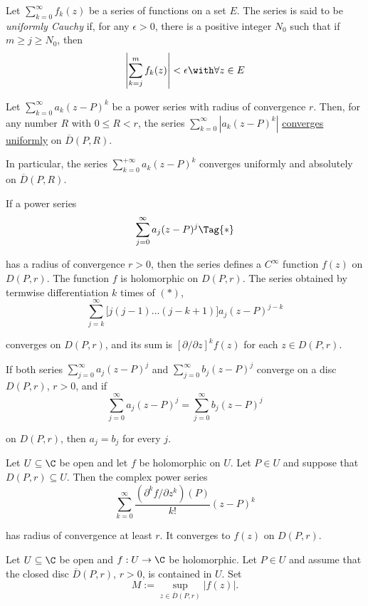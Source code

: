 Let $\sum_{k=0}^\infty f_k(z)$ be a series of functions on a set $E$. The
series is said to be \textit{uniformly Cauchy} if, for any $\epsilon>0$, there
is a positive integer $N_0$ such that if $m\geq j\geq N_0$, then
$$
  \left|\sum_{k=j}^mf_k(z)\right|<\epsilon\with\forall z\in E
$$

\label{ec076c1}

Let $\sum_{k=0}^\infty a_k(z-P)^k$ be a power series with radius of convergence
$r$. Then, for any number $R$ with $0\leq R<r$, the series
$\sum_{k=0}^\infty|a_k(z-P)^k|$ \href{bba67e4}{converges uniformly} on
$\overline D(P,R)$.

In particular, the series $\sum_{k=0}^{+\infty}a_k(z-P)^k$ converges uniformly
and absolutely on $\overline D(P,R)$.

\label{ccf2595}

If a power series
\begin{equation*}
  \sum_{j=0}^\infty a_j(z-P)^j\Tag{*}
\end{equation*}

has a radius of convergence $r>0$, then the series defines a $C^\infty$
function $f(z)$ on $D(P,r)$. The function $f$ is holomorphic on $D(P,r)$. The
series obtained by termwise differentiation $k$ times of $(*)$,
$$
  \sum_{j=k}^\infty\Big[j(j-1)\ldots(j-k+1)\Big]a_j(z-P)^{j-k}
$$

converges on $D(P,r)$, and its sum is $[\partial/\partial z]^kf(z)$ for each
$z\in D(P,r)$.

\label{ea8c930}

If both series $\sum_{j=0}^\infty a_j(z-P)^j$ and $\sum_{j=0}^\infty
b_j(z-P)^j$ converge on a disc $D(P,r)$, $r>0$, and if
$$
  \sum_{j=0}^\infty a_j(z-P)^j=\sum_{j=0}^\infty b_j(z-P)^j
$$

on $D(P,r)$, then $a_j=b_j$ for every $j$.

\label{b43209d}

Let $U\subseteq\C$ be open and let $f$ be holomorphic on $U$. Let $P\in U$ and
suppose that $D(P,r)\subseteq U$. Then the complex power series
$$
  \sum_{k=0}^\infty\frac{(\partial^kf/\partial z^k)(P)}{k!}(z-P)^k
$$

has radius of convergence at least $r$. It converges to $f(z)$ on $D(P,r)$.

\label{a2d8611}

Let $U\subseteq\C$ be open and $f:U\to\C$ be holomorphic. Let $P\in U$ and
assume that the closed disc $\overline D(P,r)$, $r>0$, is contained in $U$. Set
$$
  M:=\sup_{z\in\overline D(P,r)}|f(z)|.
$$

